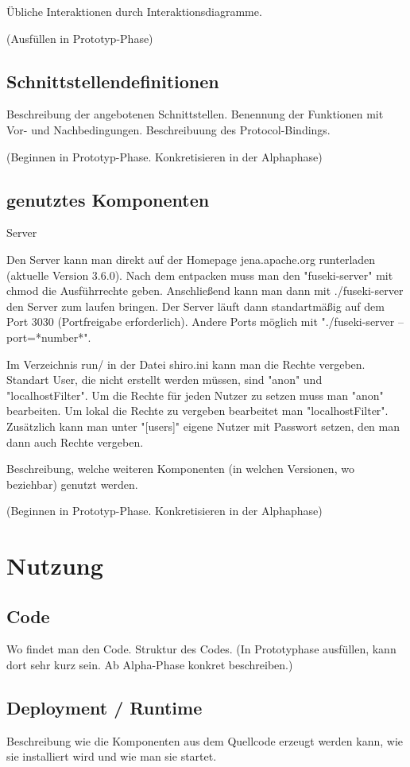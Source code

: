 Übliche Interaktionen durch Interaktionsdiagramme.

(Ausfüllen in Prototyp-Phase)

\subsection{Schnittstellendefinitionen}
Beschreibung der angebotenen Schnittstellen. Benennung der Funktionen
mit Vor- und Nachbedingungen. Beschreibuung des Protocol-Bindings.

(Beginnen in Prototyp-Phase. Konkretisieren in der Alphaphase)

\subsection{genutztes Komponenten}

Server

Den Server kann man direkt auf der Homepage jena.apache.org runterladen (aktuelle Version 3.6.0).
Nach dem entpacken muss man den "fuseki-server" mit chmod die Ausführrechte geben.
Anschließend kann man dann mit ./fuseki-server den Server zum laufen bringen.
Der Server läuft dann standartmäßig auf dem Port 3030 (Portfreigabe erforderlich).
Andere Ports möglich mit "./fuseki-server --port=*number*".

Im Verzeichnis run/ in der Datei shiro.ini kann man die Rechte vergeben.
Standart User, die nicht erstellt werden müssen, sind "anon" und "localhostFilter".
Um die Rechte für jeden Nutzer zu setzen muss man "anon" bearbeiten.
Um lokal die Rechte zu vergeben bearbeitet man "localhostFilter".
Zusätzlich kann man unter "[users]" eigene Nutzer mit Passwort setzen, den man dann auch Rechte vergeben.

Beschreibung, welche weiteren Komponenten (in welchen Versionen, wo beziehbar) genutzt werden.

(Beginnen in Prototyp-Phase. Konkretisieren in der Alphaphase)

\section{Nutzung}
\subsection{Code}
Wo findet man den Code. Struktur des Codes. (In Prototyphase ausfüllen,
kann dort sehr kurz sein. Ab Alpha-Phase konkret beschreiben.)

\subsection{Deployment / Runtime}
Beschreibung wie die Komponenten aus dem Quellcode erzeugt werden kann,
wie sie installiert wird und wie man sie startet.

